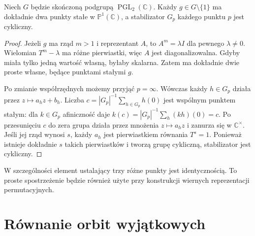 \begin{lemat}
\label{aa:lem:pgl2-fixed}
Niech $G$ będzie skończoną podgrupą
$\operatorname{PGL}_2(\mathbb C)$. Każdy $g\in G\setminus\{1\}$
ma dokładnie dwa punkty stałe w $\mathbb P^1(\mathbb C)$,
a stabilizator $G_p$ każdego punktu $p$ jest cykliczny.
\end{lemat}
\begin{proof}
Jeżeli $g$ ma rząd $m>1$ i reprezentant $A$,
to $A^m=\lambda I$ dla pewnego $\lambda\ne0$.
Wielomian $T^m-\lambda$ ma różne pierwiastki,
więc $A$ jest diagonalizowalna. Gdyby miała tylko
jedną wartość własną, byłaby skalarna. Zatem ma dokładnie
dwie proste własne, będące punktami stałymi $g$.

Po zmianie współrzędnych możemy przyjąć $p=\infty$.
Wówczas każdy $h\in G_p$ działa przez $z\mapsto a_hz+b_h$.
Liczba $c=|G_p|^{-1}\sum_{h\in G_p}h(0)$ jest wspólnym
punktem stałym: dla $k\in G_p$ afiniczność daje
$k(c)=|G_p|^{-1}\sum_h(kh)(0)=c$.
Po przesunięciu $c$ do zera grupa działa przez mnożenia
$z\mapsto a_hz$ i zanurza się w $\mathbb C^\times$.
Jeśli jej rząd wynosi $s$, każdy $a_h$ jest pierwiastkiem
równania $T^s=1$. Ponieważ istnieje dokładnie $s$ takich
pierwiastków i tworzą grupę cykliczną, stabilizator
jest cykliczny.
\end{proof}

W szczególności element ustalający trzy różne punkty
jest identycznością. To proste spostrzeżenie będzie
również użyte przy konstrukcji wiernych reprezentacji
permutacyjnych.

\section{Równanie orbit wyjątkowych}


